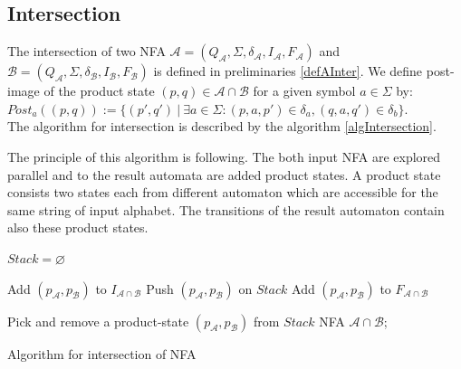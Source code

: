 \subsection{Intersection}
The intersection of two NFA $\mathcal{A}=(Q_\mathcal{A},\Sigma,\delta_\mathcal{A},I_\mathcal{A},F_\mathcal{A})$
and $\mathcal{B}=(Q_\mathcal{A},\Sigma,\delta_\mathcal{B},I_\mathcal{B},F_\mathcal{B})$ is defined 
in preliminaries \ref{defAInter}. 
We define post-image of the product state $(p,q)\in \mathcal{A}\cap\mathcal{B}$ for a given symbol $a\in \Sigma$ by:\\
$Post_a((p,q)):=\{(p',q')\ |\ \exists a \in \Sigma: (p,a,p')\in \delta_a, (q,a,q')\in \delta_b\}$.\\
The algorithm for intersection is described by the algorithm \ref{algIntersection}.

The principle of this algorithm is following. The both input NFA are explored parallel and to the result automata are added product states. 
A product state consists two states each from different automaton which are accessible for the same string of input alphabet. 
The transitions of the result automaton contain also these product states.

\begin{algorithm}
	\label{algIntersection}

  $Stack = \varnothing$\;

   {
    Add $(p_\mathcal{A},p_\mathcal{B})$ to $I_{\mathcal{A} \cap \mathcal{B}}$\;
    Push $(p_\mathcal{A},p_\mathcal{B})$ on $Stack$\; 
     {
      Add $(p_\mathcal{A},p_\mathcal{B})$ to $F_{\mathcal{A}\cap\mathcal{B}}$
    }
  }
	
   {
			Pick and remove a product-state $(p_\mathcal{A},p_\mathcal{B})$ from $Stack$\;
	 }
		\Return NFA $\mathcal{A}\cap\mathcal{B}$;
	\caption{Algorithm for intersection of NFA}
\end{algorithm}

